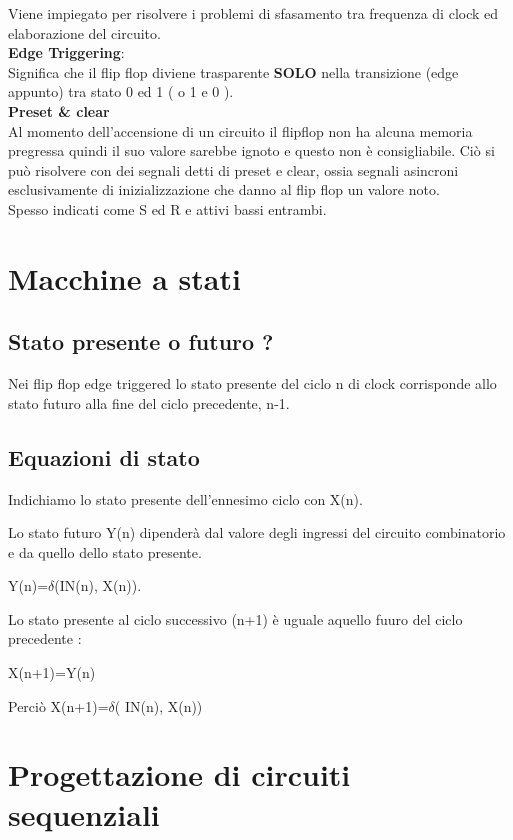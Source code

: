 \documentclass[a4paper]{book}
\begin{document}
Viene impiegato per risolvere i problemi di sfasamento tra frequenza di clock ed elaborazione del circuito.\vspace{\baselineskip}\\
\textbf{Edge Triggering}:\\
Significa che il flip flop diviene trasparente \textbf{SOLO} nella transizione (edge appunto) tra stato 0 ed 1 ( o 1 e 0 ).\vspace{\baselineskip}\\
\textbf{Preset \& clear}\\
Al momento dell'accensione di un circuito il flipflop non ha alcuna memoria pregressa quindi il suo valore sarebbe ignoto e questo non è consigliabile.
Ciò si può risolvere con dei segnali detti di preset e clear, ossia segnali asincroni esclusivamente di inizializzazione che danno al flip flop un valore noto.\\

Spesso indicati come S ed R e attivi bassi entrambi.


\section{Macchine a stati}

\subsection{Stato presente o futuro ?}
Nei flip flop edge triggered lo stato presente del ciclo n di clock corrisponde allo stato futuro alla fine del ciclo precedente, n-1.


\subsection{Equazioni di stato}

Indichiamo lo stato presente dell'ennesimo ciclo con X(n).

Lo stato futuro Y(n) dipenderà dal valore degli ingressi del circuito combinatorio e da quello dello stato presente.

Y(n)=\(\delta\)(IN(n), X(n)).

Lo stato presente al ciclo successivo (n+1) è uguale aquello fuuro del ciclo precedente :

X(n+1)=Y(n)

Perciò X(n+1)=\(\delta\)( IN(n), X(n))

\newpage
\section{Progettazione di circuiti sequenziali}
\end{document}
